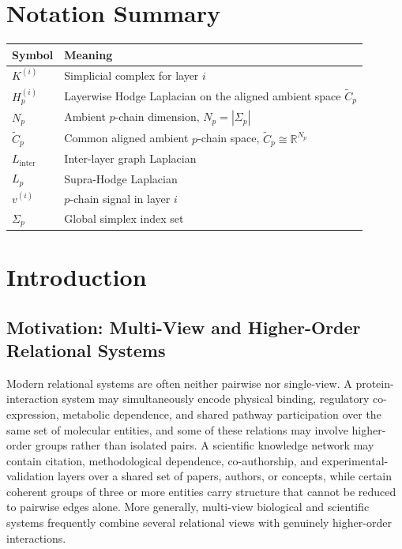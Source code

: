 \documentclass[11pt]{article}
\theoremstyle{definition}
\theoremstyle{remark}
\newcommand{\R}{\mathbb{R}}
\newcommand{\Ctil}{\widetilde{C}}
\begin{document}
\clearpage
\tableofcontents
\clearpage

\section*{Notation Summary}

\begin{center}
\begin{tabular}{ll}
\toprule
Symbol & Meaning \\
\midrule
$K^{(i)}$ & Simplicial complex for layer $i$ \\
$H_p^{(i)}$ & Layerwise Hodge Laplacian on the aligned ambient space $\Ctil_p$ \\
$N_p$ & Ambient $p$-chain dimension, $N_p=|\Sigma_p|$ \\
$\Ctil_p$ & Common aligned ambient $p$-chain space, $\Ctil_p\cong\R^{N_p}$ \\
$L_{\mathrm{inter}}$ & Inter-layer graph Laplacian \\
$L_p$ & Supra-Hodge Laplacian \\
$v^{(i)}$ & $p$-chain signal in layer $i$ \\
$\Sigma_p$ & Global simplex index set \\
\bottomrule
\end{tabular}
\end{center}

\clearpage
\section{Introduction}
\label{sec:intro}

\subsection{Motivation: Multi-View and Higher-Order Relational Systems}
\label{subsec:motivation}

Modern relational systems are often neither pairwise nor single-view. A protein-interaction system may simultaneously encode physical binding, regulatory co-expression, metabolic dependence, and shared pathway participation over the same set of molecular entities, and some of these relations may involve higher-order groups rather than isolated pairs. A scientific knowledge network may contain citation, methodological dependence, co-authorship, and experimental-validation layers over a shared set of papers, authors, or concepts, while certain coherent groups of three or more entities carry structure that cannot be reduced to pairwise edges alone. More generally, multi-view biological and scientific systems frequently combine several relational views with genuinely higher-order interactions.
\end{document}
